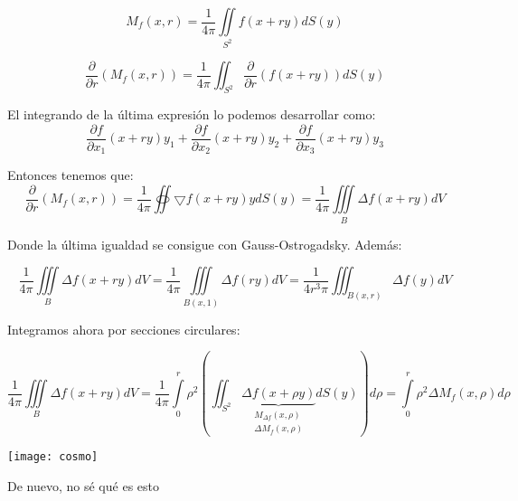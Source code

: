\documentclass[openany]{book}
\begin{document}
$$ M_{f}(x,r) = \dfrac{1}{4 \pi} \iint\limits_{S^2} f(x+ry)dS(y) $$

$$ \dfrac{\partial }{\partial r} (M_{f}(x,r)) = \dfrac{1}{4\pi} \iint _{S^2} \dfrac{\partial }{\partial r}(f(x+ry))dS(y) $$

El integrando de la última expresión lo podemos desarrollar como:
$$ \dfrac{\partial f}{\partial x_1}(x+ry)y_1+ \dfrac{\partial f}{\partial x_2}(x+ry)y_2+ \dfrac{\partial f}{\partial x_3}(x+ry)y_3 $$

Entonces tenemos que:
$$ \dfrac{\partial }{\partial r} (M_{f}(x,r)) = \dfrac{1}{4\pi} \oiint   \bigtriangledown f(x+ry)ydS(y) = \dfrac{1}{4\pi} \iiint\limits_{B}\Delta f(x+ry)dV $$

Donde la última igualdad se consigue con Gauss-Ostrogadsky. Además:

$$ \dfrac{1}{4\pi} \iiint\limits_{B}\Delta f(x+ry)dV = \dfrac{1}{4\pi}\iiint\limits_{B(x,1)} \Delta f(ry)dV = \dfrac{1}{4 r^3\pi} \iiint _{B(x,r)}\Delta f(y)dV $$

Integramos ahora por secciones circulares:

$$ \dfrac{1}{4\pi} \iiint\limits_{B}\Delta f(x+ry)dV  = \dfrac{1}{4\pi} \int\limits_{0}^{r} \rho^2 \left( \iint_{S^2} \underbrace{\Delta f(x+\rho y)} _{\substack{M_{\Delta f}(x,\rho)\\\Delta M_{f}(x,\rho)}}dS(y) \right)d\rho = \int\limits_{0}^{r}\rho^2 \Delta M_{f}(x,\rho)d\rho $$


\begin{minipage}[l]{0.1\textwidth}
  \texttt{[image: cosmo]}
  \end{minipage}
  \begin{minipage}[l]{0.8\textwidth}
  De nuevo, no sé qué es esto
\end{minipage}
\end{document}
